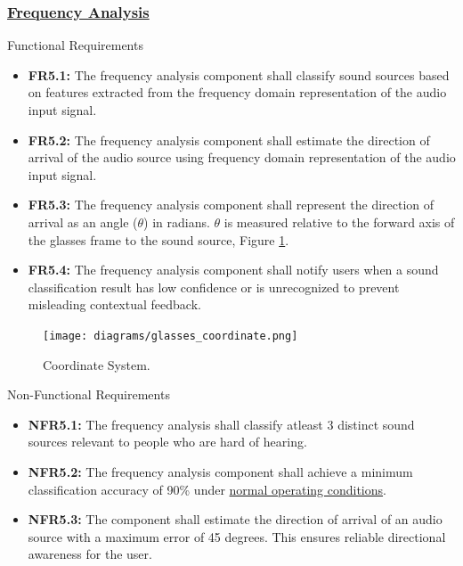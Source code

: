 \documentclass[12pt]{article}
\theoremstyle{definition}
\begin{document}
\subsubsection{\hyperref[comp:frequency_analysis]{Frequency Analysis}}
Functional Requirements
\begin{itemize}
  \item \label{FR5_1}\textbf{FR5.1:} The frequency analysis component shall
  classify sound sources based on features extracted from the frequency domain
  representation of the audio input signal.

   \item \label{FR5_2}\textbf{FR5.2:} The frequency analysis component shall
   estimate the direction of arrival of the audio source using frequency domain
   representation of the audio input signal. 
   
   \item \label{FR5_3}\textbf{FR5.3:} The frequency analysis component shall
   represent the direction of arrival as an angle ($\theta$) in radians.
   $\theta$ is measured relative to the forward axis of the glasses frame to the
   sound source, Figure \ref{fig:coordinate_system}.

   \item \label{FR5_4}\textbf{FR5.4:} The frequency analysis component shall
   notify users when a sound classification result has low confidence or is
   unrecognized to prevent misleading contextual feedback.
\end{itemize}

\begin{figure}[H]     
    \centering 
    \texttt{[image: diagrams/glasses\_coordinate.png]}
    \caption{Coordinate System.}
    \label{fig:coordinate_system}
\end{figure}

Non-Functional Requirements
\begin{itemize}
  \item \label{NFR5_1}\textbf{NFR5.1:} The frequency analysis shall classify
  atleast 3 distinct sound sources relevant to people who are hard of hearing.

  \item \label{NFR5_2}\textbf{NFR5.2:} The frequency analysis component shall
  achieve a minimum classification accuracy of 90\% under
  \hyperref[def:normal_operation_condition]{normal operating conditions}.

  \item \label{NFR5_3}\textbf{NFR5.3:} The component shall estimate the
  direction of arrival of an audio source with a maximum error of 45 degrees.
  This ensures reliable directional awareness for the user.
\end{itemize}
\end{document}
